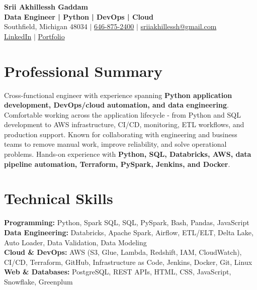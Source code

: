 \documentclass[letterpaper,10pt]{article}
\begin{document}
\fontsize{9.35pt}{10.45pt}\selectfont

\begin{center}
    {\LARGE \textbf{Srii Akhillessh Gaddam}} \\[-1pt]
    \textbf{Data Engineer | Python | DevOps | Cloud} \\[2pt]
    Southfield, Michigan 48034 $|$
    \href{tel:6468752400}{646-875-2400} $|$
    \href{mailto:sriiakhillessh@gmail.com}{sriiakhillessh@gmail.com} \\[1pt]
    \href{https://www.linkedin.com/in/srii-akhiilessh-gaddam-b48668191/}{LinkedIn} $|$
    \href{https://sriiakhillesshg.github.io/portfolio/}{Portfolio}
\end{center}
\vspace{-8pt}

\section{Professional Summary}
\small{Cross-functional engineer with experience spanning \textbf{Python application development, DevOps/cloud automation, and data engineering}. Comfortable working across the application lifecycle - from Python and SQL development to AWS infrastructure, CI/CD, monitoring, ETL workflows, and production support. Known for collaborating with engineering and business teams to remove manual work, improve reliability, and solve operational problems. Hands-on experience with \textbf{Python, SQL, Databricks, AWS, data pipeline automation, Terraform, PySpark, Jenkins, and Docker}.}

\section{Technical Skills}
\small{
\textbf{Programming:} Python, Spark SQL, SQL, PySpark, Bash, Pandas, JavaScript \\
\textbf{Data Engineering:} Databricks, Apache Spark, Airflow, ETL/ELT, Delta Lake, Auto Loader, Data Validation, Data Modeling \\
\textbf{Cloud \& DevOps:} AWS (S3, Glue, Lambda, Redshift, IAM, CloudWatch), CI/CD, Terraform, GitHub, Infrastructure as Code, Jenkins, Docker, Git, Linux \\
\textbf{Web \& Databases:} PostgreSQL, REST APIs, HTML, CSS, JavaScript, Snowflake, Greenplum
}
\end{document}
